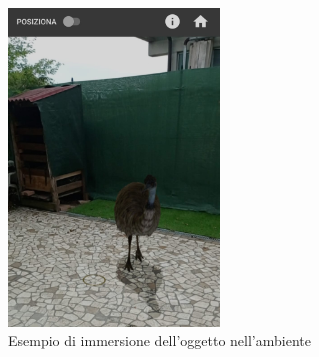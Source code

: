 \documentclass[crop=false, class=book]{standalone}
\begin{document}
	\begin{center}
		\begin{figure}[htp]
		\centering
		\includegraphics[width=0.5\textwidth]{./resources/images/EnvironmentalUnderstanding/env_understanding1.jpeg} 
		\caption{Esempio di immersione dell'oggetto nell'ambiente}
	\end{figure}
	
	\end{center}
\end{document}
